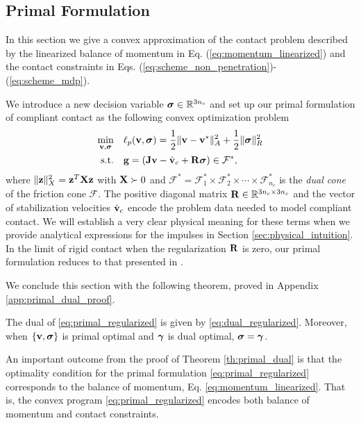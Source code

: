 \subsection{Primal Formulation}
\label{sec:primal_formulation}

In this section we give a convex approximation of the contact problem described
by the linearized balance of momentum in Eq. (\ref{eq:momentum_linearized}) and
the contact constraints in Eqs.
(\ref{eq:scheme_non_penetration})-(\ref{eq:scheme_mdp}).

We introduce a new decision variable ${\bm{\sigma}}\in\mathbb{R}^{3n_c}$ and set
up our primal formulation of compliant contact as the following convex
optimization problem
\begin{equation}
	\begin{aligned}
	\min_{\mf{v},\bsigma} \quad & \ell_p(\mf{v},\bsigma) =
	\frac{1}{2}\Vert\mf{v}-\mf{v}^*\Vert_{A}^2 +
	\frac{1}{2} \Vert\bsigma\Vert_{R}^2\\
	\textrm{s.t.} \quad & \mf{g} = (\mf{J}\mf{v}-\hat{\mf{v}}_c + \mf{R}\bsigma) \in \mathcal{F}^*,\\
	\end{aligned}
	\label{eq:primal_regularized}
\end{equation}
where $\Vert{\mathbf{z}}\Vert_X^2={\mathbf{z}}^T{\mathbf{X}}{\mathbf{z}}$ with ${\mathbf{X}}\succ 0$ and
$\mathcal{F^*}= \mathcal{F}^*_1 \times \mathcal{F}^*_2 \times \cdots \times
\mathcal{F}^*_{n_c}$ is the \emph{dual cone} of the friction cone $\mathcal{F}$.
The positive diagonal matrix ${\mathbf{R}}\in\mathbb{R}^{3n_c\times 3n_c}$ and the
vector of stabilization velocities $\hat{{\mathbf{v}}}_c$ encode the problem data
needed to model compliant contact. We will establish a very clear physical
meaning for these terms when we provide analytical expressions for the impulses
in Section \ref{sec:physical_intuition}. In the limit of rigid contact when the
regularization ${\mathbf{R}}$ is zero, our primal formulation reduces to that
presented in \cite{bib:mazhar2014}.

We conclude this section with the following theorem, proved in Appendix
\ref{app:primal_dual_proof}.

\begin{theorem}\label{th:primal_dual} The dual of \eqref{eq:primal_regularized}
is given by \eqref{eq:dual_regularized}. Moreover, when $\{{\mathbf{v}},{\bm\sigma}\}$ is
primal optimal and ${\bm\gamma}$ is dual optimal, ${\bm\sigma} = {\bm\gamma}$.
\end{theorem}

An important outcome from the proof of Theorem \ref{th:primal_dual} is that the
optimality condition for the primal formulation \eqref{eq:primal_regularized}
corresponds to the balance of momentum, Eq. \eqref{eq:momentum_linearized}. That
is, the convex program \eqref{eq:primal_regularized} encodes both balance of
momentum and contact constraints.

